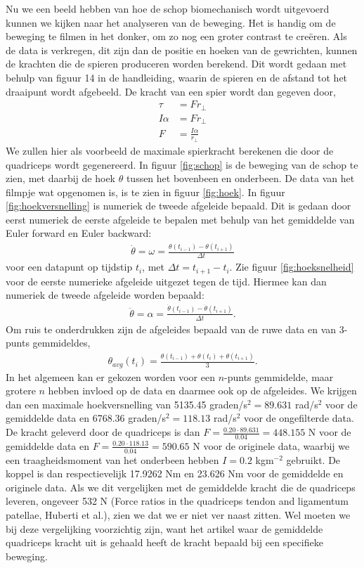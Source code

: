\documentclass{article}
\begin{document}
Nu we een beeld hebben van hoe de schop biomechanisch wordt uitgevoerd kunnen we kijken naar het analyseren van de beweging. Het is handig om de beweging te filmen in het donker, om zo nog een groter contrast te creëren. Als de data is verkregen, dit zijn dan de positie en hoeken van de gewrichten, kunnen de krachten die de spieren produceren worden berekend. Dit wordt gedaan met behulp van figuur 14 in de handleiding, waarin de spieren en de afstand tot het draaipunt wordt afgebeeld. De kracht van een spier wordt dan gegeven door,
\begin{align*}
    \tau &= Fr_\perp \\
    I\alpha &= Fr_\perp\\
    F &= \frac{I\alpha}{r_\perp}
\end{align*}
We zullen hier als voorbeeld de maximale spierkracht berekenen die door de quadriceps wordt gegenereerd. In figuur \ref{fig:schop} is de beweging van de schop te zien, met daarbij de hoek $\theta$ tussen het bovenbeen en onderbeen. De data van het filmpje wat opgenomen is, is te zien in figuur \ref{fig:hoek}. In figuur \ref{fig:hoekversnelling} is numeriek de tweede afgeleide bepaald. Dit is gedaan door eerst numeriek de eerste afgeleide te bepalen met behulp van het gemiddelde van Euler forward en Euler backward: 
\begin{align*}
    \dot{\theta}=\omega=\frac{\theta(t_{i-1}) - \theta(t_{i+1})}{\Delta t}
\end{align*}
voor een datapunt op tijdstip $t_i$, met $\Delta t=t_{i+1}-t_i$. Zie figuur \ref{fig:hoeksnelheid} voor de eerste numerieke afgeleide uitgezet tegen de tijd. Hiermee kan dan numeriek de tweede afgeleide worden bepaald:
\begin{align*}
    \ddot{\theta}=\alpha=\frac{\dot{\theta}(t_{i-1}) - \dot{\theta}(t_{i+1})}{\Delta t}.
\end{align*}
Om ruis te onderdrukken zijn de afgeleides bepaald van de ruwe data en van 3-punts gemmideldes,
\begin{align*}
    \theta_{avg}(t_i)=\frac{\theta(t_{i-1})+\theta(t_i)+\theta(t_{i+1})}{3}.
\end{align*}
In het algemeen kan er gekozen worden voor een $n$-punts gemmidelde, maar grotere $n$ hebben invloed op de data en daarmee ook op de afgeleides. We krijgen dan een maximale hoekversnelling van 5135.45 graden/s$^2=89.631$ rad/s$^2$ voor de gemiddelde data en 6768.36 graden/s$^2=118.13$ rad/s$^2$ voor de ongefilterde data. De kracht geleverd door de quadriceps is dan $F=\frac{0.20 \cdot 89.631}{0.04}=448.155$ N voor de gemiddelde data en $F=\frac{0.20 \cdot 118.13}{0.04}=590.65$ N voor de originele data, waarbij we een traagheidsmoment van het onderbeen hebben $I=0.2$ kgm$^{-2}$ gebruikt. De koppel is dan respectievelijk 17.9262 Nm en 23.626 Nm voor de gemiddelde en originele data. Als we dit vergelijken met de gemiddelde kracht die de quadriceps leveren, ongeveer 532 N (Force ratios in the quadriceps tendon and ligamentum patellae, Huberti et al.), zien we dat we er niet ver naast zitten. Wel moeten we bij deze vergelijking voorzichtig zijn, want het artikel waar de gemiddelde quadriceps kracht uit is gehaald heeft de kracht bepaald bij een specifieke beweging.
\end{document}
